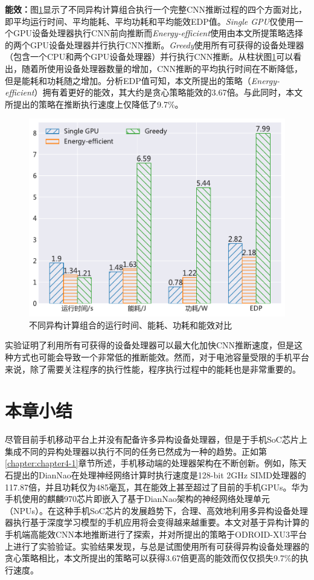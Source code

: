 \textbf{能效：}图\ref{figure:figure35}显示了不同异构计算组合执行一个完整CNN推断过程的四个方面对比，即平均运行时间、平均能耗、平均功耗和平均能效EDP值。\emph{Single GPU}仅使用一个GPU设备处理器执行CNN前向推断而\emph{Energy-efficient}使用由本文所提策略选择的两个GPU设备处理器并行执行CNN推断。\emph{Greedy}使用所有可获得的设备处理器（包含一个CPU和两个GPU设备处理器）并行执行CNN推断。从柱状图\ref{figure:figure35}可以看出，随着所使用设备处理器数量的增加，CNN推断的平均执行时间在不断降低，但是能耗和功耗随之增加。分析EDP值可知，本文所提出的策略（\emph{Energy-efficient}）拥有着更好的能效，其大约是贪心策略能效的3.67倍。与此同时，本文所提出的策略在推断执行速度上仅降低了9.7\%。

\begin{figure}[htbp]
    \centering
    \includegraphics[height=0.4\textwidth]{figures/hc_gpu.pdf}
    \caption{不同异构计算组合的运行时间、能耗、功耗和能效对比}\label{figure:figure35}
\end{figure}

实验证明了利用所有可获得的设备处理器可以最大化加快CNN推断速度，但是这种方式也可能会导致一个非常低的推断能效。然而，对于电池容量受限的手机平台来说，除了需要关注程序的执行性能，程序执行过程中的能耗也是非常重要的\cite{brooks2000power}。

\section{本章小结}

尽管目前手机移动平台上并没有配备许多异构设备处理器，但是于手机SoC芯片上集成不同的异构处理器以执行不同的任务已然成为一种的趋势。正如第\ref{chapter:chapter4-1}章节所述，手机移动端的处理器架构在不断创新。例如，陈天石提出的DianNao在处理神经网络计算时执行速度是128-bit 2GHz SIMD处理器的117.87倍，并且功耗仅为485毫瓦\cite{chen2014diannao}，其在能效上甚至超过了目前的手机GPUs。华为手机使用的麒麟970芯片即嵌入了基于DianNao架构的神经网络处理单元（NPUs）。在这种手机SoC芯片的发展趋势下，合理、高效地利用多异构设备处理器执行基于深度学习模型的手机应用将会变得越来越重要。本文对基于异构计算的手机端高能效CNN本地推断进行了探索，并对所提出的策略于ODROID-XU3平台上进行了实验验证。实验结果发现，与总是试图使用所有可获得异构设备处理器的贪心策略相比，本文所提出的策略可以获得3.67倍更高的能效而仅仅损失9.7\%的执行速度。

\cleardoublepage 